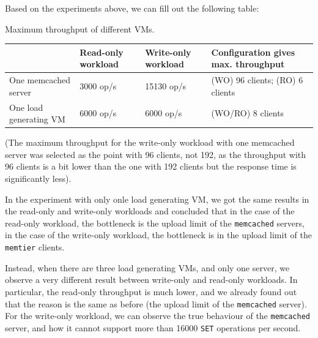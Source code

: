 \documentclass[11pt,a4paper]{article}
\renewcommand{\t}[1]{%
	{\texttt{#1}}}
\begin{document}
Based on the experiments above, we can fill out the following table:

\begin{center}
	{Maximum throughput of different VMs.}
	\begin{tabular}{|l|p{2cm}|p{2cm}|p{4cm}|}
		\hline                        & Read-only workload & Write-only workload & Configuration gives max. throughput \\ 
		\hline One memcached server   & 3000 op/s          & 15130 op/s          & (WO) 96 clients; (RO) 6 clients                          \\ 
		\hline One load generating VM & 6000 op/s          & 6000 op/s           & (WO/RO) 8 clients                           \\ 
		\hline 
	\end{tabular}
\end{center}
(The maximum throughput for the write-only workload with one memcached server
was selected as the point with 96 clients, not 192, as the throughput with 96
clients is a bit lower than the one with 192 clients but the response time
is significantly less).

\vspace{1em}

In the experiment with only onle load generating VM, we got the same results in
the read-only and write-only workloads and
concluded that in the
case of the read-only workload, the bottleneck is the upload limit of the
\t{memcached} servers, in the case of the write-only workload, the bottleneck is
in the upload limit of the \t{memtier} clients.

Instead, when there are three load generating VMs, and only one server, we
observe a very different result between write-only and read-only workloads. In
particular, the read-only throughput is much lower, and we already found out that
the reason is the same as before (the upload limit of the \t{memcached}
server). For the write-only workload, we can observe the true behaviour of the
\t{memcached} server, and how it cannot support more than 16000 \t{SET}
operations per second.
\end{document}
